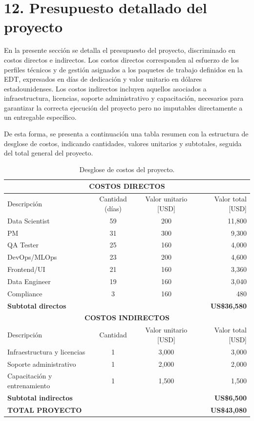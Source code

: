 \documentclass[12pt]
{charter}
\begin{document}
\section{12. Presupuesto detallado del proyecto}
\label{sec:presupuesto}

En la presente sección se detalla el presupuesto del proyecto, discriminado en costos directos e indirectos. 
Los costos directos corresponden al esfuerzo de los perfiles técnicos y de gestión asignados a los paquetes de trabajo definidos en la EDT, expresados en días de dedicación y valor unitario en dólares estadounidenses. Los costos indirectos incluyen aquellos asociados a infraestructura, licencias, soporte administrativo y capacitación, necesarios para garantizar la correcta ejecución del proyecto pero no imputables directamente a un entregable específico. 

De esta forma, se presenta a continuación una tabla resumen con la estructura de desglose de costos, 
indicando cantidades, valores unitarios y subtotales, seguida del total general del proyecto.

\begin{table}[!htbp]
\centering
\scriptsize
\caption{Desglose de costos del proyecto.}
\label{tab:costos}
\begin{tabularx}{\textwidth}{Xccr}
\toprule
\multicolumn{4}{c}{\textbf{COSTOS DIRECTOS}} \\
\midrule
Descripción & Cantidad (días) & Valor unitario [USD] & Valor total [USD] \\
\midrule
Data Scientist & 59 & 200 & 11,800 \\
PM & 31 & 300 & 9,300 \\
QA Tester & 25 & 160 & 4,000 \\
DevOps/MLOps & 23 & 200 & 4,600 \\
Frontend/UI & 21 & 160 & 3,360 \\
Data Engineer & 19 & 160 & 3,040 \\
Compliance & 3 & 160 & 480 \\
\midrule
\textbf{Subtotal directos} & & & \textbf{US\$36,580} \\
\midrule
\multicolumn{4}{c}{\textbf{COSTOS INDIRECTOS}} \\
\midrule
Descripción & Cantidad & Valor unitario [USD] & Valor total [USD] \\
\midrule
Infraestructura y licencias & 1 & 3,000 & 3,000 \\
Soporte administrativo & 1 & 2,000 & 2,000 \\
Capacitaci\'on y entrenamiento & 1 & 1,500 & 1,500 \\
\midrule
\textbf{Subtotal indirectos} & & & \textbf{US\$6,500} \\
\midrule
\textbf{TOTAL PROYECTO} & & & \textbf{US\$43,080} \\
\bottomrule
\end{tabularx}
\end{table}
\FloatBarrier
\end{document}
